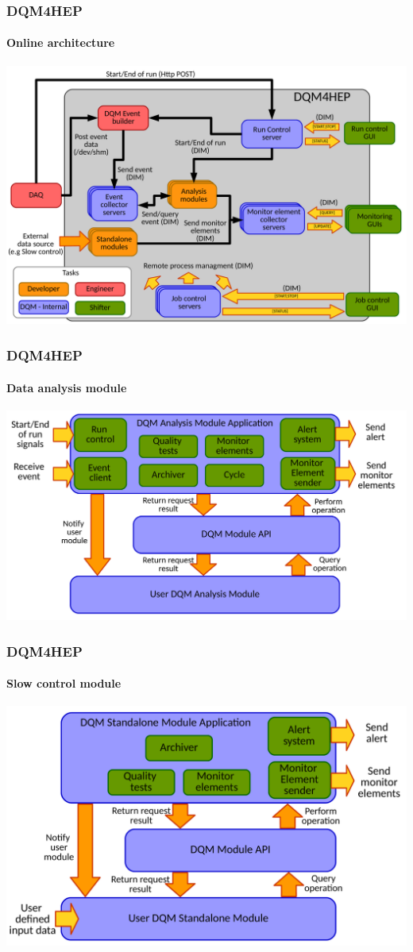 \documentclass[presentation, 10pt]{beamer}
\begin{document}
\begin{frame}
  \frametitle{DQM4HEP}
  \framesubtitle{Online architecture}
  \centering\includegraphics[width=0.9\linewidth]{figs/GlobalArchitectureDiagram.pdf}
\end{frame}

\begin{frame}
  \frametitle{DQM4HEP}
  \framesubtitle{Data analysis module}
  \centering\includegraphics[width=0.9\linewidth]{figs/AnalysisModuleApplicationDiagram.pdf}
\end{frame}

\begin{frame}
  \frametitle{DQM4HEP}
  \framesubtitle{Slow control module}
  \centering\includegraphics[width=0.9\linewidth]{figs/StandaloneModuleApplicationDiagram.pdf}
\end{frame}
\end{document}

